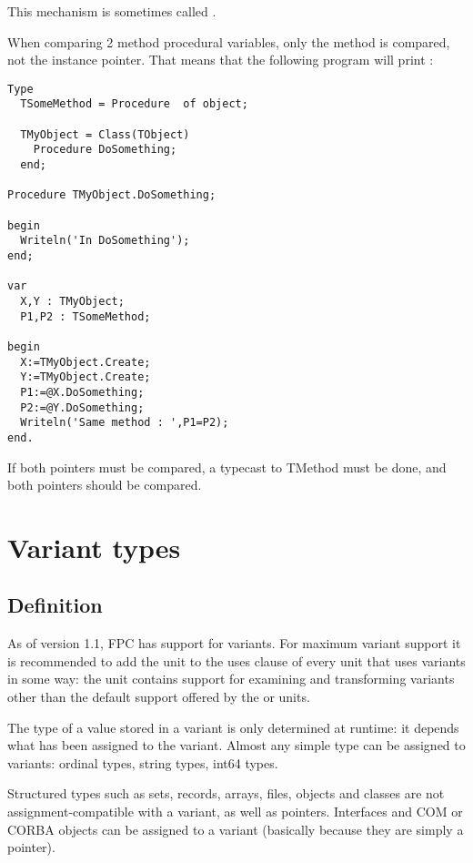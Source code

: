 This mechanism is sometimes called .

\begin{remark}
When comparing 2 method procedural variables, only the method is compared,
not the instance pointer. That means that the following program will print :
\begin{verbatim}
Type 
  TSomeMethod = Procedure  of object;

  TMyObject = Class(TObject)
    Procedure DoSomething;
  end;

Procedure TMyObject.DoSomething;

begin
  Writeln('In DoSomething');
end;

var
  X,Y : TMyObject;
  P1,P2 : TSomeMethod;

begin
  X:=TMyObject.Create;
  Y:=TMyObject.Create;
  P1:=@X.DoSomething;
  P2:=@Y.DoSomething;
  Writeln('Same method : ',P1=P2);
end.
\end{verbatim}
If both pointers must be compared, a typecast to TMethod must be done, and
both pointers should be compared.
\end{remark}

\section{Variant types}
 
\subsection{Definition}
As of version 1.1, FPC has support for variants. For maximum variant support 
it is recommended to add the  unit to the uses clause of every 
unit that uses variants in some way: the  unit contains support for
examining and transforming variants other than the default support offered
by the  or  units.

The type of a value stored in a variant is only determined at runtime: 
it depends what has been assigned to the variant. Almost any simple type 
can be assigned to variants: ordinal types, string types, int64 types.

Structured types such as sets, records, arrays, files, objects and classes 
are not assignment-compatible with a variant, as well as pointers. 
Interfaces and COM or CORBA objects can be assigned to a
variant (basically because they are simply a pointer).

